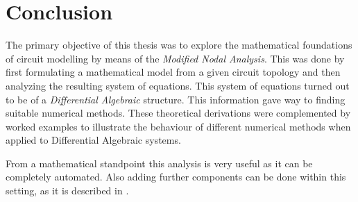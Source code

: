\section{Conclusion}

The primary objective of this thesis was to explore the mathematical foundations of circuit modelling by means of the \emph{Modified Nodal Analysis}. This was done by first formulating a mathematical model from a given circuit topology and then analyzing the resulting system of equations. This system of equations turned out to be of a \emph{Differential Algebraic} structure. This information gave way to finding suitable numerical methods. These theoretical derivations were complemented by worked examples to illustrate the behaviour of different numerical methods when applied to Differential Algebraic systems.

From a mathematical standpoint this analysis is very useful as it can be completely automated. Also adding further components can be done within this setting, as it is described in \cite{ModellingAndDiscretizationOfCircuitProblems}.